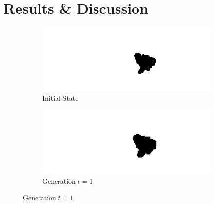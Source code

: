\chapter{Results \& Discussion} %
\label{Chapter4} %
\begin{figure}[H]
\begin{subfigure}{.5\textwidth}
  \centering
  \includegraphics[width=1\linewidth]{Figures/Chapter4/generation-0-melusi}
  \caption*{Initial State}
\end{subfigure}
\begin{subfigure}{.5\textwidth}
  \centering
  \includegraphics[width=1\linewidth]{Figures/Chapter4/generation-1-melusi}
  \caption*{Generation $t = 1$}
\end{subfigure}
\end{figure}

